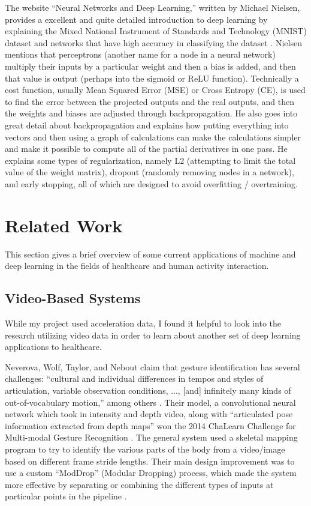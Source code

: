 \documentclass[]{report}
\begin{document}
The website ``Neural Networks and Deep Learning,'' written by Michael Nielsen, provides a excellent and quite detailed introduction to deep learning by explaining the Mixed National Instrument of Standards and Technology (MNIST) dataset and networks that have high accuracy in classifying the dataset \cite{NNDL}. Nielsen mentions that perceptrons (another name for a node in a neural network) multiply their inputs by a particular weight and then a bias is added, and then that value is output (perhaps into the sigmoid or ReLU function). Technically a cost function, usually Mean Squared Error (MSE) or Cross Entropy (CE), is used to find the error between the projected outputs and the real outputs, and then the weights and biases are adjusted through backpropagation. He also goes into great detail about backpropagation and explains how putting everything into vectors and then using a graph of calculations can make the calculations simpler and make it possible to compute all of the partial derivatives in one pass. He explains some types of regularization, namely L2 (attempting to limit the total value of the weight matrix), dropout (randomly removing nodes in a network), and early stopping, all of which are designed to avoid overfitting / overtraining.


\section{Related Work}

This section gives a brief overview of some current applications of machine and deep learning in the fields of healthcare and human activity interaction.


\subsection{Video-Based Systems}

While my project used acceleration data, I found it helpful to look into the research utilizing video data in order to learn about another set of deep learning applications to healthcare.

Neverova, Wolf, Taylor, and Nebout claim that gesture identification has several challenges: ``cultural and individual differences in tempos and styles of articulation, variable observation conditions, ..., [and] infinitely many kinds of out-of-vocabulary motion,'' among others \cite{Neverova}. Their model, a convolutional neural network which took in intensity and depth video, along with ``articulated pose information extracted from depth maps'' won the 2014 ChaLearn Challenge for Multi-modal Gesture Recognition \cite{Neverova}. The general system used a skeletal mapping program to try to identify the various parts of the body from a video/image based on different frame stride lengths. Their main design improvement was to use a custom ``ModDrop'' (Modular Dropping) process, which made the system more effective by separating or combining the different types of inputs at particular points in the pipeline \cite{Neverova}. 
\end{document}
